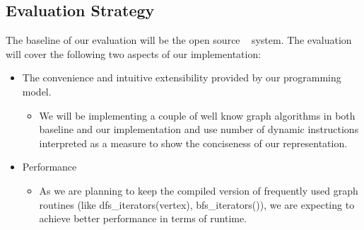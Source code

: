 \documentclass[12,twoside]{article}
\begin{document}
\subsection{Evaluation Strategy}
The baseline of our evaluation will be the open source ~\cite{Graphal} system.  
  The evaluation will
  cover the following two aspects of our implementation:
  \begin{itemize}
    \item The convenience and intuitive extensibility provided by our 
      programming model.
    \begin{itemize}
      \item We will be implementing a couple of well know graph algorithms in 
        both baseline and our implementation
        and use number of dynamic instructions interpreted as a measure to show 
        the conciseness of our
        representation.
    \end{itemize}
    \item Performance
    \begin{itemize}
      \item As we are planning to keep the compiled version of frequently used 
        graph routines (like dfs\_iterators(vertex), bfs\_iterators()), we are 
        expecting to achieve better performance in terms of runtime.  
        \end{itemize}
  \end{itemize}





\end{document}
